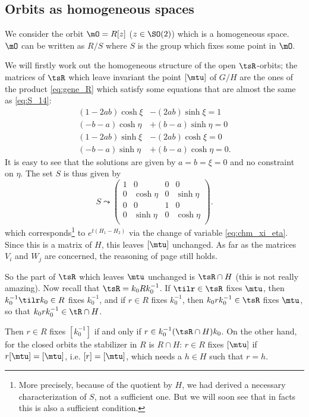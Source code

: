 \subsection{Orbits as homogeneous spaces}

 We consider the orbit $\mO=R[z]$ ($z\in \SO(2)$) which is a homogeneous space.  $\mO$ can be written as $R/S$ where $S$ is the group which fixes some point in $\mO$.

We will firstly work out the homogeneous structure of the open $\tsR$-orbits; the matrices of $\tsR$ which leave invariant the point $[\mtu]$ of $G/H$ are the ones of the product \eqref{eq:gene_R} which satisfy some equations that are almost the same as \eqref{eq:S_14}:
\begin{subequations}
\begin{align}
  (1-2ab)\cosh\xi&-(2ab)\sinh\xi=1   \\
  (-b-a)\cosh\eta&+(b-a)\sinh\eta=0   \\
  (1-2ab)\sinh\xi&-(2ab)\cosh\xi=0    \\
  (-b-a)\sinh\eta&+(b-a)\cosh\eta=0.  
\end{align}
\end{subequations}
It is easy to see that the solutions are given by $a=b=\xi=0$ and no constraint on $\eta$. The set $S$ is thus given by
\begin{equation}
S\leadsto
\begin{pmatrix}
 1 & 0 & 0 & 0 \\
 0 & \cosh\eta & 0 & \sinh\eta \\
 0 & 0 & 1 & 0 \\
 0 & \sinh\eta & 0 & \cosh\eta \\
\end{pmatrix}.
\end{equation}
which corresponds\footnote{More precisely, because of the quotient by $H$, we had derived a necessary characterization of $S$, not a sufficient one. But we will soon see that in facts this is also a sufficient condition.} to $ e^{t(H_{1}-H_{2})}$ via the change of variable \eqref{eq:chm_xi_eta}. Since this is a matrix of $H$, this leaves $[\mtu]$ unchanged. As far as the matrices $V_i$ and $W_j$ are concerned, the reasoning of page \pageref{pg:influence_V_W} still holds.

So the part of $\tsR$ which leaves $\mtu$ unchanged is $\tsR\cap H$ (this is not really amazing). Now recall that $\tsR=k_0Rk_0^{-1}$. If $\tilr\in\tsR$ fixes $\mtu$, then $k_0^{-1}\tilr k_0\in R$ fixes $k_0^{-1}$, and if $r\in R$ fixes $k_0^{-1}$, then $k_0rk_0^{-1}\in\tsR$ fixes $\mtu$, so that $k_0rk_0^{-1}\in\tR\cap H$.

Then $r\in R$ fixes $[k_0^{-1}]$ if and only if $r\in k_0^{-1}(\tsR\cap H)k_0$. On the other hand, for the closed orbits the stabilizer in $R$ is $R\cap H$: $r\in R$ fixes $[\mtu]$ if $r[\mtu]=[\mtu]$, i.e. $[r]=[\mtu]$, which needs a $h\in H$ such that $r=h$.

